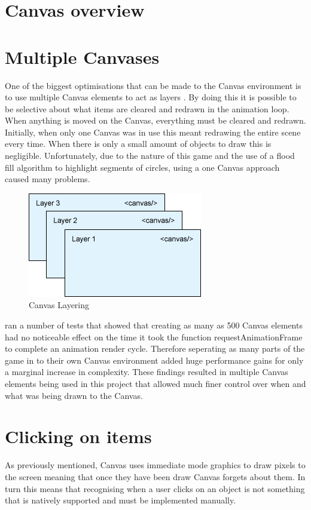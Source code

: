\documentclass[12pt,a4paper]{report}
\begin{document}
\section{Canvas overview}


\section{Multiple Canvases}
One of the biggest optimisations that can be made to the Canvas environment is to use multiple Canvas elements to act as layers \citep{IBMCanvasLayers}. By doing this it is possible to be selective about what items are cleared and redrawn in the animation loop. When anything is moved on the Canvas, everything must be cleared and redrawn. Initially, when only one Canvas was in use this meant redrawing the entire scene every time. When there is only a small amount of objects to draw this is negligible. Unfortunately, due to the nature of this game and the use of a flood fill algorithm to highlight segments of circles, using a one Canvas approach caused many problems.
\begin{figure}[h]
\centering
    \includegraphics[scale=0.5]{canvasLayers}
    \caption{Canvas Layering}
    \label{fig:canvasLayering}
\end{figure}


\cite{StackCanvasTest} ran a number of tests that showed that creating as many as 500 Canvas elements had no noticeable effect on the time it took the function requestAnimationFrame to complete an animation render cycle. Therefore seperating as many parts of the game in to their own Canvas environment added huge performance gains for only a marginal increase in complexity. These findings resulted in multiple Canvas elements being used in this project that allowed much finer control over when and what was being drawn to the Canvas.



\section{Clicking on items}
As previously mentioned, Canvas uses immediate mode graphics to draw pixels to the screen meaning that once they have been draw Canvas forgets about them. In turn this means that recognising when a user clicks on an object is not something that is natively supported  and must be implemented manually. 
\end{document}
